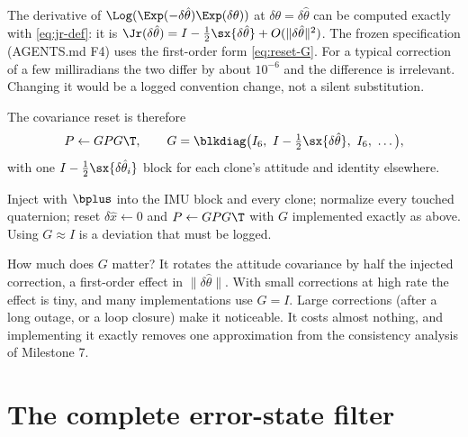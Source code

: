 \begin{remark}
The derivative of $\Log(\Exp(-\delta\hat\theta)\Exp(\delta\theta))$ at $\delta\theta = \delta\hat\theta$ can be computed exactly with
\eqref{eq:jr-def}: it is $\Jr(\delta\hat\theta) = I - \tfrac12\sx{\delta\hat\theta} + O(\|\delta\hat\theta\|^2)$. The frozen
specification (AGENTS.md F4) uses the first-order form \eqref{eq:reset-G}. For a typical correction of a few
milliradians the two differ by about $10^{-6}$ and the difference is irrelevant. Changing it would be a
logged convention change, not a silent substitution.
\end{remark}

The covariance reset is therefore
\begin{equation}
  P \gets G P G\T, \qquad G = \blkdiag\big(I_6,\ I - \tfrac12\sx{\delta\hat\theta},\ I_6,\ \ldots\big),
\end{equation}
with one $I - \tfrac12\sx{\delta\hat\theta_i}$ block for each clone's attitude and identity elsewhere.

\begin{convention}
Inject with $\bplus$ into the IMU block and every clone; normalize every touched quaternion; reset
$\delta\hat x \gets 0$ and $P \gets GPG\T$ with $G$ implemented exactly as above. Using $G \approx I$ is a deviation
that must be logged.
\end{convention}

How much does $G$ matter? It rotates the attitude covariance by half the injected correction, a
first-order effect in $\|\delta\hat\theta\|$. With small corrections at high rate the effect is tiny, and many
implementations use $G = I$. Large corrections (after a long outage, or a loop closure) make it
noticeable. It costs almost nothing, and implementing it exactly removes one approximation from the
consistency analysis of Milestone 7.

\section{The complete error-state filter}

